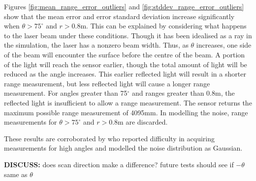 		Figures \ref{fig:mean_range_error_outliers} and \ref{fig:stddev_range_error_outliers} show that the mean error and error standard deviation increase significantly when $\theta > 75^\circ$ and $r > 0.8$m. This can be explained by considering what happens to the laser beam under these conditions. Though it has been idealised as a ray in the simulation, the laser has a nonzero beam width. Thus, as $\theta$ increases, one side of the beam will encounter the surface before the centre of the beam. A portion of the light will reach the sensor earlier, though the total amount of light will be reduced as the angle increases. This earlier reflected light will result in a shorter range measurement, but less reflected light will cause a longer range measurement. For angles greater than 75$^\circ$ and ranges greater than 0.8m, the reflected light is insufficient to allow a range measurement. The sensor returns the maximum possible range measurement of 4095mm. In modelling the noise, range measurements for $\theta > 75^\circ$ and $r > 0.8$m are discarded.
		
		These results are corroborated by \cite{park2010characterization} who reported difficulty in acquiring measurements for high angles and modelled the noise distribution as Gaussian.
		
		\textbf{DISCUSS:} does scan direction make a difference? future tests should see if $-\theta$ same as $\theta$
		
